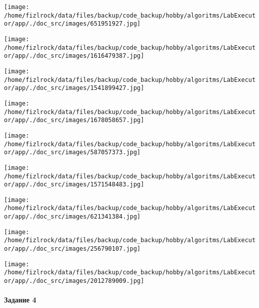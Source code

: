 \documentclass[a4paper, 12pt]{article}
\begin{document}
\texttt{[image: /home/fizlrock/data/files/backup/code\_backup/hobby/algoritms/LabExecutor/app/./doc\_src/images/651951927.jpg]}

\texttt{[image: /home/fizlrock/data/files/backup/code\_backup/hobby/algoritms/LabExecutor/app/./doc\_src/images/1616479387.jpg]}

\texttt{[image: /home/fizlrock/data/files/backup/code\_backup/hobby/algoritms/LabExecutor/app/./doc\_src/images/1541899427.jpg]}

\texttt{[image: /home/fizlrock/data/files/backup/code\_backup/hobby/algoritms/LabExecutor/app/./doc\_src/images/1678058657.jpg]}

\texttt{[image: /home/fizlrock/data/files/backup/code\_backup/hobby/algoritms/LabExecutor/app/./doc\_src/images/587057373.jpg]}

\texttt{[image: /home/fizlrock/data/files/backup/code\_backup/hobby/algoritms/LabExecutor/app/./doc\_src/images/1571548483.jpg]}

\texttt{[image: /home/fizlrock/data/files/backup/code\_backup/hobby/algoritms/LabExecutor/app/./doc\_src/images/621341384.jpg]}

\texttt{[image: /home/fizlrock/data/files/backup/code\_backup/hobby/algoritms/LabExecutor/app/./doc\_src/images/256790107.jpg]}

\texttt{[image: /home/fizlrock/data/files/backup/code\_backup/hobby/algoritms/LabExecutor/app/./doc\_src/images/2012789009.jpg]}
\pagebreak
\paragraph{Задание 4}
\end{document}
